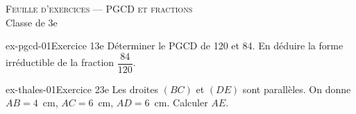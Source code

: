 \documentclass[11pt,a4paper]{article}
\begin{document}
\begin{center}
  {\Large \textsc{Feuille d'exercices — PGCD et fractions}}\\[4pt]
  Classe de 3e
\end{center}

\vspace{10pt}

\begin{askme}{ex-pgcd-01}{Exercice 1}{3e}
Déterminer le PGCD de 120 et 84. En déduire la forme irréductible de la fraction
$\dfrac{84}{120}$.
\end{askme}

\begin{askme}{ex-thales-01}{Exercice 2}{3e}
Les droites $(BC)$ et $(DE)$ sont parallèles. On donne $AB = 4$~cm,
$AC = 6$~cm, $AD = 6$~cm. Calculer $AE$.
\end{askme}
\end{document}
